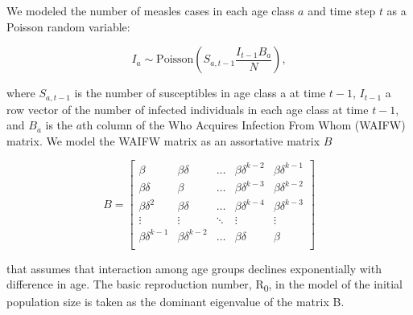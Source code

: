 We modeled the number of measles cases in each age class \(a\) and time step \(t\) as a Poisson random variable:

\begin{equation}
I_a \sim \text{Poisson}\left(S_{a,t-1} \frac{I_{t-1}B_a}{N} \right),
\end{equation}

where \(S_{a,t-1}\) is the number of susceptibles in age class a at time \(t-1\), \(I_{t-1}\) a row vector of the number of infected individuals in each age class at time \(t-1\), and \(B_a\) is the \(a\)th column of the Who Acquires Infection From Whom (WAIFW) matrix.  We model the WAIFW matrix as an assortative matrix \(B\)

\begin{equation}
B = \left[{
\begin{array}{ccccc}
  {\beta} & {\beta \delta} & \ldots & {\beta \delta^{k-2}} & {\beta \delta^{k-1}}  \\
  {\beta \delta} & {\beta} & \ldots & {\beta \delta^{k-3}} & {\beta \delta^{k-2}} \\
{\beta \delta^2} & {\beta \delta} & \ldots & {\beta \delta^{k-4}} & {\beta \delta^{k-3}}  \\
  \vdots & \vdots & \ddots & \vdots & \vdots \\
  {\beta \delta^{k-1}} & {\beta \delta^{k-2}} & \ldots & {\beta \delta} & {\beta}  \\
\end{array}
}\right]
\end{equation}

that assumes that interaction among age groups declines exponentially with difference in age. The basic reproduction number, R\textsubscript{0}, in the model of the initial population size is taken as the dominant eigenvalue of the matrix B.